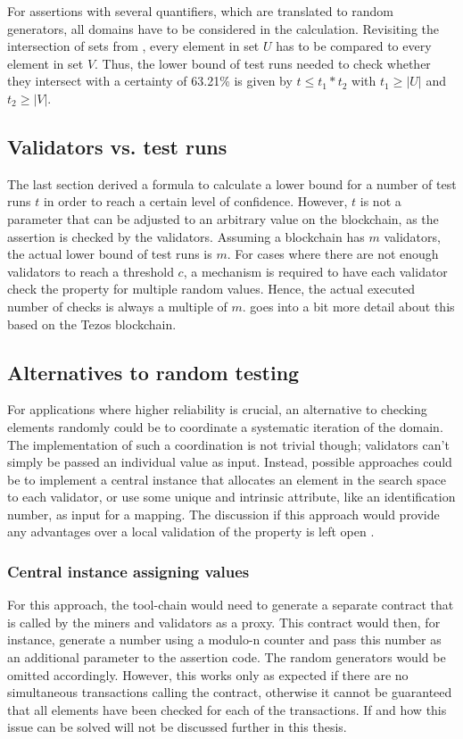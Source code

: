 For assertions with several quantifiers, which are translated to random generators, all domains have to be considered in the calculation. Revisiting the intersection of sets from , every element in set $U$ has to be compared to every element in set $V$. Thus, the lower bound of test runs needed to check whether they intersect with a certainty of 63.21\% is given by $t \leq t_1 * t_2$ with $t_1 \geq |U|$ and $t_2 \geq |V|$.

\subsection{Validators vs. test runs}
The last section derived a formula to calculate a lower bound for a number of test runs $t$ in order to reach a certain level of confidence. However, $t$ is not a parameter that can be adjusted to an arbitrary value on the blockchain, as the assertion is checked by the validators. Assuming a blockchain has $m$ validators, the actual lower bound of test runs is $m$. For cases where there are not enough validators to reach a threshold $c$, a mechanism is required to have each validator check the property for multiple random values. Hence, the actual executed number of checks is always a multiple of $m$. \secref{} goes into a bit more detail about this based on the Tezos blockchain. 

\subsection{Alternatives to random testing}\label{sec:alt_random}
For applications where higher reliability is crucial, an alternative to checking elements randomly could be to coordinate a systematic iteration of the domain. The implementation of such a coordination is not trivial though; validators can't simply be passed an individual value as input. Instead, possible approaches could be to implement a central instance that allocates an element in the search space to each validator, or use some unique and intrinsic attribute, like an identification number, as input for a mapping. The discussion if this approach would provide any advantages over a local validation of the property is left open .

\subsubsection{Central instance assigning values}
For this approach, the tool-chain would need to generate a separate contract that is called by the miners and validators as a proxy. This contract would then, for instance, generate a number using a modulo-n counter and pass this number as an additional parameter to the assertion code. The random generators would be omitted accordingly. However, this works only as expected if there are no simultaneous transactions calling the contract, otherwise it cannot be guaranteed that all elements have been checked for each of the transactions. If and how this issue can be solved will not be discussed further in this thesis.


